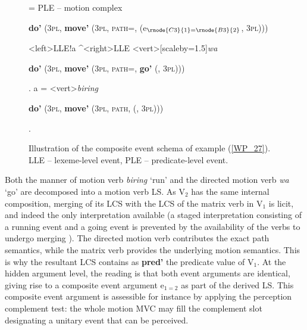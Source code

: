 \begin{figure}


\jtree[xunit=9.5em,yunit=2em]
\! = {PLE -- motion complex}{\begin{scriptsize}\textbf{do'} (3\textsc{pl}, \textbf{move'} (3\textsc{pl}, \textsc{path=}, \textbf{} (e$_{\rnode{C3}{1}=\rnode{B3}{2}}$, 3\textsc{pl})))\end{scriptsize}}
<left>{LLE}!a ^<right>{LLE}
<vert>[scaleby=1.5]{\textit{wa}}{\begin{scriptsize} \textbf{do'} (3\textsc{pl}, \textbf{move'} (3\textsc{pl}, \textsc{path=}, \textbf{go'} (, 3\textsc{pl})))\end{scriptsize}}.
\!a = <vert>{\textit{biring}}
{\begin{scriptsize} \textbf{do'} (3\textsc{pl}, \textbf{move'} (3\textsc{pl}, \textsc{path}, \textbf{} (, 3\textsc{pl})))\end{scriptsize}}.
\endjtree

\caption[Event schema illustration of example (\ref{WP_27})]{Illustration of the composite event schema of example (\ref{WP_27}). LLE -- lexeme-level event, PLE -- predicate-level event.}
\label{figure:eventschema_WP1}
\end{figure}

Both the manner of motion verb \textit{biring} `run' and the directed motion verb \textit{wa} `go' are decomposed into a motion verb LS. As V$_2$ has the same internal composition, merging of its LCS with the LCS of the matrix verb in V$_1$ is licit, and indeed the only interpretation available (a staged interpretation consisting of a running event and a going event is prevented by the availability of the verbs to undergo merging ). The directed motion verb contributes the exact path semantics, while the matrix verb provides the underlying motion semantics. This is why the resultant LCS contains as \textbf{pred'} the predicate value of V$_1$. At the hidden argument level, the reading is that both event arguments are identical, giving rise to a composite event argument e$_{1=2}$ as part of the derived LS. This composite event argument is assessible for instance by applying the perception complement test: the whole motion MVC may fill the complement slot designating a unitary event that can be perceived.

